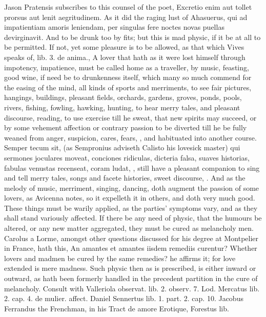 Jason Pratensis subscribes to this counsel of the poet, Excretio
enim aut tollet prorsus aut lenit aegritudinem. As it did the raging
lust of Ahasuerus, qui ad impatientiam amoris leniendam, per
singulas fere noctes novas puellas devirginavit. And to be drunk too by
fits; but this is mad physic, if it be at all to be permitted. If not,
yet some pleasure is to be allowed, as that which Vives speaks of, lib.
3. de anima., A lover that hath as it were lost himself through
impotency, impatience, must be called home as a traveller, by music,
feasting, good wine, if need be to drunkenness itself, which many so
much commend for the easing of the mind, all kinds of sports and
merriments, to see fair pictures, hangings, buildings, pleasant fields,
orchards, gardens, groves, ponds, pools, rivers, fishing, fowling,
hawking, hunting, to hear merry tales, and pleasant discourse, reading,
to use exercise till he sweat, that new spirits may succeed, or by some
vehement affection or contrary passion to be diverted till he be fully
weaned from anger, suspicion, cares, fears, \etc{}, and habituated into
another course. Semper tecum sit, (as Sempronius adviseth Calisto
his lovesick master) qui sermones joculares moveat, conciones
ridiculas, dicteria falsa, suaves historias, fabulas venustas
recenseat, coram ludat, \etc{}, still have a pleasant companion to sing
and tell merry tales, songs and facete histories, sweet discourse, \etc{}.
And as the melody of music, merriment, singing, dancing, doth augment
the passion of some lovers, as  Avicenna notes, so it expelleth
it in others, and doth very much good. These things must be warily
applied, as the parties' symptoms vary, and as they shall stand
variously affected.
If there be any need of physic, that the humours be altered, or any new
matter aggregated, they must be cured as melancholy men. Carolus a
Lorme, amongst other questions discussed for his degree at Montpelier
in France, hath this, An amantes et amantes iisdem remediis curentur?
Whether lovers and madmen be cured by the same remedies? he affirms it;
for love extended is mere madness. Such physic then as is prescribed,
is either inward or outward, as hath been formerly handled in the
precedent partition in the cure of melancholy. Consult with Valleriola
observat. lib. 2. observ. 7. Lod. Mercatus lib. 2. cap. 4. de mulier.
affect. Daniel Sennertus lib. 1. part. 2. cap. 10. Jacobus
Ferrandus the Frenchman, in his \textlatin{Tract de amore Erotique}, Forestus lib.
